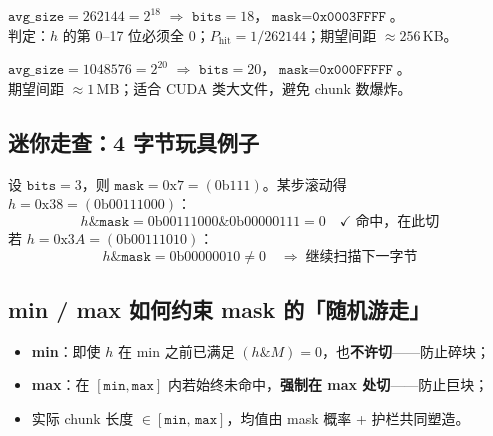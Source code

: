\begin{example}[Default：avg = 256\,KB]
$\texttt{avg\_size} = 262144 = 2^{18}$ $\Rightarrow$ $\texttt{bits}=18$，$\texttt{mask}=\texttt{0x0003FFFF}$。\\
判定：$h$ 的第 0--17 位必须全 0；$P_{\text{hit}}=1/262144$；期望间距 $\approx 256$\,KB。
\end{example}

\begin{example}[Large Profile：avg = 1\,MB]
$\texttt{avg\_size} = 1048576 = 2^{20}$ $\Rightarrow$ $\texttt{bits}=20$，$\texttt{mask}=\texttt{0x000FFFFF}$。\\
期望间距 $\approx 1$\,MB；适合 CUDA 类大文件，避免 chunk 数爆炸。
\end{example}

\subsection{迷你走查：4 字节玩具例子}

\begin{warnbox}[仅为说明位运算；真实 $w=64$，此处省略窗口预热]
设 $\texttt{bits}=3$，则 $\texttt{mask}=0\text{x}7=(0\text{b}111)$。某步滚动得 $h=0\text{x}38=(0\text{b}00111000)$：
\[
  h \mathbin{\&} \texttt{mask} = 0\text{b}00111000 \mathbin{\&} 0\text{b}00000111 = 0 \quad\checkmark\;\text{命中，在此切}
\]
若 $h=0\text{x}3A=(0\text{b}00111010)$：
\[
  h \mathbin{\&} \texttt{mask} = 0\text{b}00000010 \neq 0 \quad\Rightarrow\;\text{继续扫描下一字节}
\]
\end{warnbox}

\subsection{min / max 如何约束 mask 的「随机游走」}

\begin{itemize}[nosep]
  \item \textbf{min}：即使 $h$ 在 min 之前已满足 $(h\mathbin{\&}M)=0$，也\textbf{不许切}——防止碎块；
  \item \textbf{max}：在 $[\texttt{min},\texttt{max}]$ 内若始终未命中，\textbf{强制在 max 处切}——防止巨块；
  \item 实际 chunk 长度 $\in [\texttt{min},\,\texttt{max}]$，均值由 mask 概率 + 护栏共同塑造。
\end{itemize}

